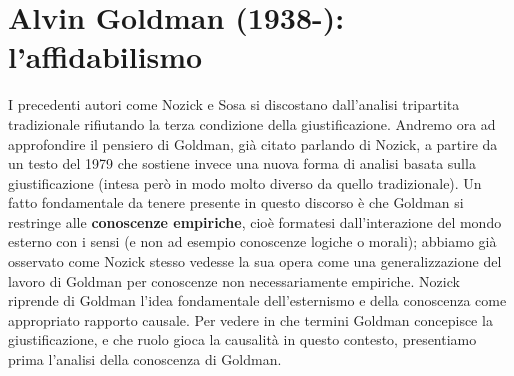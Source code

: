 \documentclass[10pt,a4paper]{article}
\begin{document}
\section{Alvin Goldman (1938-): l'affidabilismo}\label{sec:goldman}
I precedenti autori come Nozick e Sosa si discostano dall'analisi tripartita tradizionale rifiutando la terza condizione della giustificazione. Andremo ora ad approfondire il pensiero di Goldman, già citato parlando di Nozick, a partire da un testo del 1979 che sostiene invece una nuova forma di analisi basata sulla giustificazione (intesa però in modo molto diverso da quello tradizionale). Un fatto fondamentale da tenere presente in questo discorso è che Goldman si restringe alle \textbf{conoscenze empiriche}, cioè formatesi dall'interazione del mondo esterno con i sensi (e non ad esempio conoscenze logiche o morali); abbiamo già osservato come Nozick stesso vedesse la sua opera come una generalizzazione del lavoro di Goldman per conoscenze non necessariamente empiriche. Nozick riprende di Goldman l'idea fondamentale dell'esternismo e della conoscenza come appropriato rapporto causale. Per vedere in che termini Goldman concepisce la giustificazione, e che ruolo gioca la causalità in questo contesto, presentiamo prima l'analisi della conoscenza di Goldman. 
\end{document}
